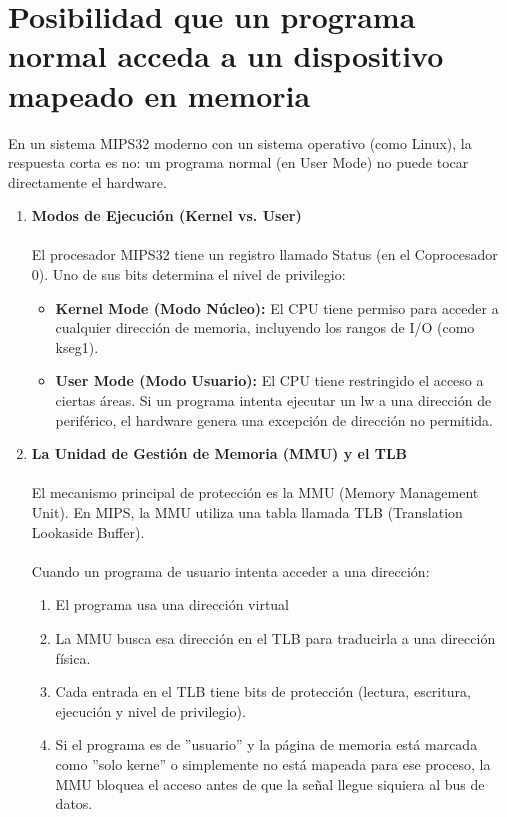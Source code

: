 \documentclass[]{article}
\begin{document}
\section{Posibilidad que un programa normal acceda a un dispositivo mapeado 
	en memoria}			

	En un sistema MIPS32 moderno con un sistema operativo (como Linux), la respuesta corta es no: un programa normal (en User Mode) no puede tocar directamente el hardware.
	\begin{enumerate}
		\item \textbf{Modos de Ejecución (Kernel vs. User)}\\\\
			El procesador MIPS32 tiene un registro llamado Status (en el Coprocesador 0). Uno de sus bits determina el nivel de privilegio:
			\begin{itemize}
				\item \textbf{Kernel Mode (Modo Núcleo):} El CPU tiene permiso para acceder a cualquier dirección de memoria, incluyendo los rangos de I/O (como kseg1).
				\item \textbf{User Mode (Modo Usuario):} El CPU tiene restringido el acceso a ciertas áreas. Si un programa intenta ejecutar un lw a una dirección de periférico, el hardware genera una excepción de dirección no permitida.
			\end{itemize}
		\item \textbf{La Unidad de Gestión de Memoria (MMU) y el TLB}\\\\
			El mecanismo principal de protección es la MMU (Memory Management Unit). En MIPS, la MMU utiliza una tabla llamada TLB (Translation Lookaside Buffer).\\\\
			Cuando un programa de usuario intenta acceder a una dirección:
			\begin{enumerate}
				\item El programa usa una dirección virtual
				\item La MMU busca esa dirección en el TLB para traducirla a una dirección física.
				\item Cada entrada en el TLB tiene bits de protección (lectura, escritura, ejecución y nivel de privilegio).
				\item Si el programa es de ''usuario'' y la página de memoria está marcada como ''solo kerne'' o simplemente no está mapeada para ese proceso, la MMU bloquea el acceso antes de que la señal llegue siquiera al bus de datos.
			\end{enumerate}

\end{enumerate}
\end{document}

